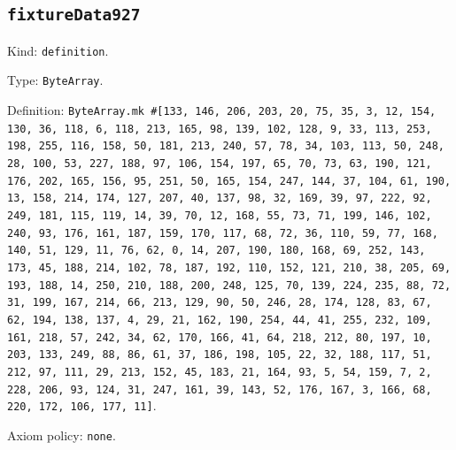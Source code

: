 \documentclass[11pt]{article}
\begin{document}
\subsection*{\texttt{fixtureData927}}
\noindent Kind: \texttt{definition}.\par
\noindent Type: \texttt{ByteArray}.\par
\noindent Definition: \texttt{ByteArray.mk \#[133, 146, 206, 203, 20, 75, 35, 3, 12, 154, 130, 36, 118, 6, 118, 213, 165, 98, 139, 102, 128, 9, 33, 113, 253, 198, 255, 116, 158, 50, 181, 213, 240, 57, 78, 34, 103, 113, 50, 248, 28, 100, 53, 227, 188, 97, 106, 154, 197, 65, 70, 73, 63, 190, 121, 176, 202, 165, 156, 95, 251, 50, 165, 154, 247, 144, 37, 104, 61, 190, 13, 158, 214, 174, 127, 207, 40, 137, 98, 32, 169, 39, 97, 222, 92, 249, 181, 115, 119, 14, 39, 70, 12, 168, 55, 73, 71, 199, 146, 102, 240, 93, 176, 161, 187, 159, 170, 117, 68, 72, 36, 110, 59, 77, 168, 140, 51, 129, 11, 76, 62, 0, 14, 207, 190, 180, 168, 69, 252, 143, 173, 45, 188, 214, 102, 78, 187, 192, 110, 152, 121, 210, 38, 205, 69, 193, 188, 14, 250, 210, 188, 200, 248, 125, 70, 139, 224, 235, 88, 72, 31, 199, 167, 214, 66, 213, 129, 90, 50, 246, 28, 174, 128, 83, 67, 62, 194, 138, 137, 4, 29, 21, 162, 190, 254, 44, 41, 255, 232, 109, 161, 218, 57, 242, 34, 62, 170, 166, 41, 64, 218, 212, 80, 197, 10, 203, 133, 249, 88, 86, 61, 37, 186, 198, 105, 22, 32, 188, 117, 51, 212, 97, 111, 29, 213, 152, 45, 183, 21, 164, 93, 5, 54, 159, 7, 2, 228, 206, 93, 124, 31, 247, 161, 39, 143, 52, 176, 167, 3, 166, 68, 220, 172, 106, 177, 11]}.\par
\noindent Axiom policy: \texttt{none}.\par
\end{document}
